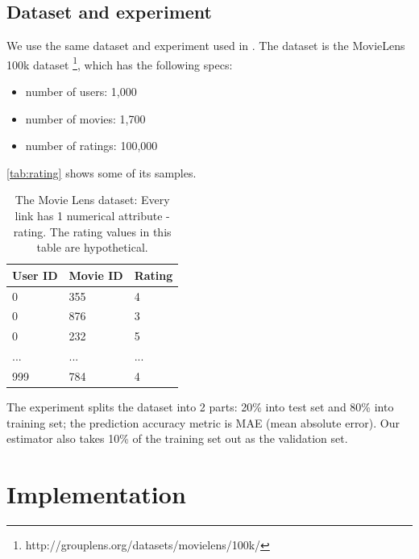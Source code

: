 \documentclass{article}
\begin{document}
\subsection{Dataset and experiment}
We use the same dataset and experiment used in \cite{hwang2016efficient}. The 
dataset is the MovieLens 100k dataset 
\cite{harper2015movielens}  
\footnote{http://grouplens.org/datasets/movielens/100k/}, which has the 
following specs:
\begin{itemize}
	\item number of users: 1,000
	\item number of movies: 1,700
	\item number of ratings: 100,000
\end{itemize}
\autoref{tab:rating} shows some of its samples.
\begin{table}[h]
	\centering
	\caption{The Movie Lens dataset: Every link has 1 numerical attribute - 
		rating. The rating values in this table are hypothetical.}
	\begin{tabularx}{0.5\textwidth}{ |X|X|X| }  \hline
		\textbf{User ID} & \textbf{Movie ID} & \textbf{Rating} \\ \hline
		0 & 355 & 4 \\ \hline
		0 & 876 & 3 \\ \hline
		0 & 232 & 5 \\ \hline
		... & ... & ... \\ \hline
		999 & 784 & 4 \\ \hline
	\end{tabularx}
	\label{tab:rating}
\end{table}
The experiment splits the dataset into 2 parts: 20\% into test set and 80\% 
into training set; the prediction accuracy metric is MAE (mean absolute error).
Our estimator also takes 10\% of the training set out as the validation set.

\section{Implementation}
\end{document}
